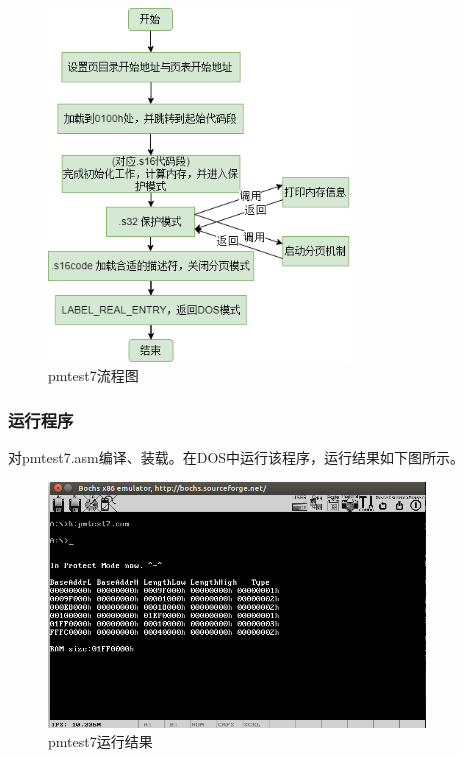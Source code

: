 \documentclass[UTF8,12pt]{ctexart}
\begin{document}
    \begin{figure}[H]
        \centering
        \includegraphics[width=8cm]{images/pmtest7.png}
        \caption{pmtest7流程图}
        \label{pmtest7流程图}
    \end{figure}
    
    \subsubsection{运行程序}
    对pmtest7.asm编译、装载。在DOS中运行该程序，运行结果如下图所示。
    \begin{figure}[H]
        \centering
        \includegraphics[width=10cm]{images/pmtest7_result.png}
        \caption{pmtest7运行结果}
        \label{pmtest7运行结果}
    \end{figure}
    
\end{document}
